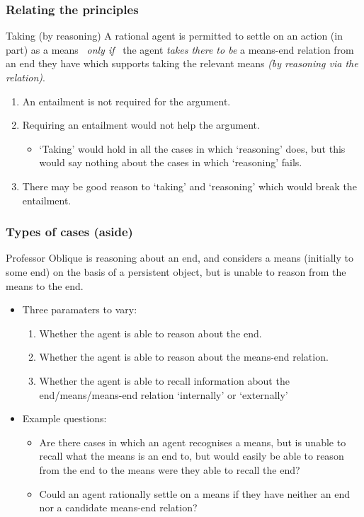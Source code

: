 \documentclass[noamssymb,
]{beamer} %
\begin{document}
\begin{frame}
  \frametitle{Relating the principles}

  \begin{block}{Taking (by reasoning)}
    A rational agent is permitted to settle on an action (in part) as a means
    \newline
    \mbox{ }\hfill\emph{only if}\hfill\mbox{ }
    \newline
    the agent \emph{takes there to be}  a means-end relation from an end they have which supports taking the relevant means \emph{(by reasoning via the relation)}.
  \end{block}

  \begin{enumerate}
  \item An entailment is not required for the argument.
  \item Requiring an entailment would not help the argument.
    \begin{itemize}
    \item `Taking' would hold in all the cases in which `reasoning' does, but this would say nothing about the cases in which `reasoning' fails.
    \end{itemize}
  \item There may be good reason to `taking' and `reasoning' which would break the entailment.
  \end{enumerate}
\end{frame}


\begin{frame}
  \frametitle{Types of cases (aside)}

  Professor Oblique is reasoning about an end, and considers a means (initially to some end) on the basis of a persistent object, but is unable to reason from the means to the end.
  \begin{itemize}
  \item Three paramaters to vary:
    \begin{enumerate}
    \item Whether the agent is able to reason about the end.
    \item Whether the agent is able to reason about the means-end relation.
    \item Whether the agent is able to recall information about the end/means/means-end relation `internally' or `externally'
    \end{enumerate}
  \item Example questions:
    \begin{itemize}
    \item Are there cases in which an agent recognises a means, but is unable to recall what the means is an end to, but would easily be able to reason from the end to the means were they able to recall the end?
    \item Could an agent rationally settle on a means if they have neither an end nor a candidate means-end relation?
    \end{itemize}
  \end{itemize}
\end{frame}
\end{document}
